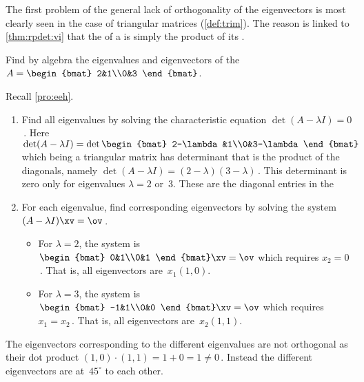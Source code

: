 The first problem of the general lack of orthogonality of the eigenvectors is most clearly seen in the case of triangular matrices (\cref{def:trim}).
The reason is  linked to \cref{thm:rpdet:vi} that the  of a  is simply the product of its .

\begin{example} 
Find by algebra the eigenvalues and eigenvectors of the  \(A=\begin{bmat} 2&1\\0&3 \end{bmat}\).
\begin{solution} 
Recall \cref{pro:eeh}. 
\begin{enumerate}
\item Find all eigenvalues by solving the characteristic equation \(\det(A-\lambda I)=0\)\,. 
Here \(\det(A-\lambda I)=\det\begin{bmat} 2-\lambda&1\\0&3-\lambda \end{bmat}\) which being a triangular matrix has determinant that is the product of the diagonals, namely \(\det(A-\lambda I)=(2-\lambda)(3-\lambda)\)\,.
This determinant is zero only for eigenvalues \(\lambda=2\) or~\(3\).
These are the diagonal entries in the 
\item For each eigenvalue, find corresponding eigenvectors by solving the system \((A-\lambda I)\xv=\ov\)\,.
\begin{itemize}
\item For \(\lambda=2\), the system is \(\begin{bmat} 0&1\\0&1 \end{bmat}\xv=\ov\) which requires \(x_2=0\)\,.  That is, all eigenvectors are~\(x_1(1,0)\).
\item For \(\lambda=3\), the system is \(\begin{bmat} -1&1\\0&0 \end{bmat}\xv=\ov\) which requires \(x_1=x_2\)\,.  That is, all eigenvectors are~\(x_2(1,1)\).
\end{itemize}
\end{enumerate}
The eigenvectors corresponding to the different eigenvalues are not orthogonal as their dot product \((1,0)\cdot(1,1)=1+0=1\neq 0\)\,. 
Instead the different eigenvectors are at~\(45^\circ\) to each other.
\end{solution}
\end{example}



